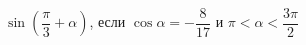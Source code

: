 \begin{ex}[type=simplify_calculate]
	\begin{condition}
		\( \sin\left( \dfrac{\pi}{3}+\alpha \right) \), \quad если \( \cos\alpha=-\dfrac{8}{17} \) и \( \pi<\alpha<\dfrac{3\pi}{2} \)
	\end{condition}
\end{ex}